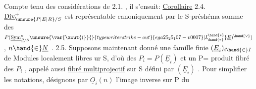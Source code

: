 Compte tenu des considérations de 2.1. , il s'ensuit:
\uline{Corollaire} 2.4. $\underline{\mathrm{Div}}^{+}_{\unsure{P|E|R}/S}$ est représentable canoniquement  par
le S-préshéma somme des $P(\underline{\mathrm{Sym}}^{n}_{\underline{P}/S}\unsure{\var{\xout{(}}{}{typewriter strike-out}{ega25_25_107-v0007}|I^{\hand{*}}_{\hand{*}}}\underline{E})^{\hand{\vee}})$ , $n \hand{\in} \underline{N}$ .
2.5. Supposons maintenant donné une famille finie $(\underline{E}_i)_{i \hand{\in} I}$ de Modules
localement libres ur S, d'où des $P_i = P(\underline{E}_i)$ et un P= produit fibré des
$P_i$ , appelé aussi \uline{fibré multiprojectif} sur S défini par $(\underline{E}_i)$ . Pour
simplifier les notations, désignons par $\underline{O}_i(n)$ l'image inverse sur P du

